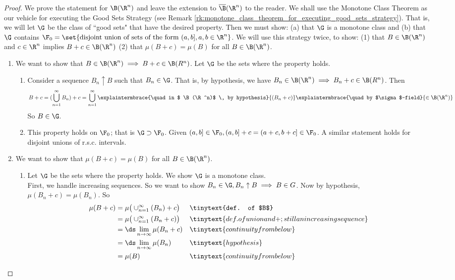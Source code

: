 \documentclass{article} %
\newenvironment{alphabate}
    {\begin{enumerate}[label=\alph*)]}
	{\end{enumerate} }
\begin{document}
\begin{proof}
We prove the statement for $\B(\R^n)$ and leave the extension to $\overline{\B}(\R^n)$ to the reader. We shall use the Monotone Class Theorem as our vehicle for executing the Good Sets Strategy (see Remark \ref{rk:monotone_class_theorem_for_executing_good_sets_strategy}).  That is, we will let $\G$ be the class of ``good sets" that have the desired property. Then we must show: (a) that $\G$ is a monotone class and (b) that $\G$ contains $\F_0 = \set{\text{disjoint union of sets of the form } (a,b], a, b \in \R^n}$. We will use this strategy twice, to show: (1) that $B \in \B(\R^n)$ and $c \in \R^n$ implies $B+c \in  \B(\R^n)$  (2) that $\mu(B+c)=\mu(B)$ for all $B \in \B(\R^n)$.  

\begin{enumerate}
\item We want to show that $B \in \B(\R^n) \implies B+c \in \B(R^n)$.  Let $\G$ be the sets where the property holds.
	\begin{alphabate}
	\item Consider a sequence $B_n \uparrow B$ such that $B_n \in \G$.  That is, by hypothesis, we have $B_n \in \B(\R^n) \implies B_n+c \in \B(R^n)$.  Then 
	\[  B+c = (\bigcup_{n=1}^\infty B_n) + c = \bigcup_{n=1}^\infty \explaintermbrace{\quad in $ \B(\R^n)$ \, by hypothesis}{(B_n + c)} \explaintermbrace{\quad by $\sigma$-field}{\in \B(\R^n)}\]
	So $B \in \G$.
	\item This property holds on $\F_0$; that is $\G \supset \F_0$.   Given $(a,b] \in \F_0, (a,b]+c = (a+c,b+c] \in \F_0$.  A similar statement holds for disjoint unions of r.s.c. intervals. 
	\end{alphabate}
\item We want to show that $\mu(B+c)=\mu(B)$ for all $B \in \B(\R^n)$.
	\begin{alphabate}
	\item Let $\G$ be the sets where the property holds. We show $\G$ is a monotone class. \\
	 
	 First, we handle increasing sequences. So we want to show $B_n \in \G, B_n \uparrow B \implies B \in G$.   Now by hypothesis, $\mu(B_n + c) = \mu(B_n)$.  So 
	 \begin{align*}
	 \mu(B+c) &=  \mu \big( \cup_{n=1}^\infty (B_n)+c \big)  && \tinytext{def. of $B$} \\
	  &=  \mu \big( \cup_{n=1}^\infty (B_n+c) \big)  && \tinytext{def. of union and +; still an increasing sequence} \\
	 &= \ds\lim_{n \to \infty} \mu(B_n+c)  && \tinytext{continuity from below} \\
	 &= \ds\lim_{n \to \infty} \mu(B_n) && \tinytext{hypothesis} \\
	 &= \mu(B) && \tinytext{continuity from below}
	 \end{align*}
 

\end{alphabate}
\end{enumerate}
\end{proof}
\end{document}
